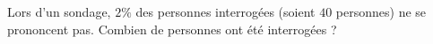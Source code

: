 
\begin{exercice}\label{exoPremiere-0013}

    Lors d'un sondage, \( 2\%\) des personnes interrogées (soient \( 40\) personnes) ne se prononcent pas. Combien de personnes ont été interrogées ?

\end{exercice}
